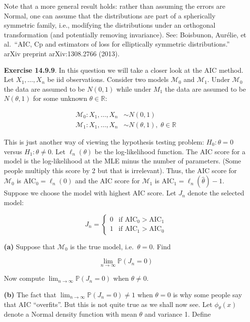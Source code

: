 Note that a more general result holds: rather than assuming the errors
are Normal, one can assume that the distributions are part of a
spherically symmetric family, i.e., modifying the distributions under an
orthogonal transformation (and potentially removing invariance). See:
Boisbunon, Aurélie, et al.~``AIC, Cp and estimators of loss for
elliptically symmetric distributions.'' arXiv preprint arXiv:1308.2766
(2013).

\textbf{Exercise 14.9.9}. In this question we will take a closer look at
the AIC method. Let \(X_1, \dots, X_n\) be iid observations. Consider
two models \(\mathcal{M}_0\) and \(\mathcal{M}_1\). Under
\(\mathcal{M}_0\) the data are assumed to be \(N(0, 1)\) while under
\(M_1\) the data are assumed to be \(N(\theta, 1)\) for some unknown
\(\theta \in \mathbb{R}\):

\begin{align}
\mathcal{M}_0 : X_1, \dots, X_n &\sim N(0, 1) \\
\mathcal{M}_1 : X_1, \dots, X_n &\sim N(\theta, 1), \; \theta \in \mathbb{R}
\end{align}

This is just another way of viewing the hypothesis testing problem:
\(H_0: \theta = 0\) versus \(H_1: \theta \neq 0\). Let
\(\ell_n(\theta)\) be the log-likelihood function. The AIC score for a
model is the log-likelihood at the MLE minus the number of parameters.
(Some people multiply this score by 2 but that is irrelevant). Thus, the
AIC score for \(\mathcal{M}_0\) is \(\text{AIC}_0 = \ell_n(0)\) and the
AIC score for \(\mathcal{M}_1\) is
\(\text{AIC}_1 = \ell_n(\hat{\theta}) - 1\). Suppose we choose the model
with highest AIC score. Let \(J_n\) denote the selected model:

\[J_n = \begin{cases}
0 & \text{if } \text{AIC}_0 > \text{AIC}_1 \\
1 & \text{if } \text{AIC}_1 > \text{AIC}_0
\end{cases}\]

\textbf{(a)} Suppose that \(\mathcal{M}_0\) is the true model,
i.e.~\(\theta = 0\). Find

\[ \lim_{n \rightarrow \infty} \mathbb{P}(J_n = 0) \]

Now compute \(\lim_{n \rightarrow \infty} \mathbb{P}(J_n = 0)\) when
\(\theta \neq 0\).

\textbf{(b)} The fact that
\(\lim_{n \rightarrow \infty} \mathbb{P}(J_n = 0) \neq 1\) when
\(\theta = 0\) is why some people say that AIC ``overfits''. But this is
not quite true as we shall now see. Let \(\phi_\theta(x)\) denote a
Normal density function with mean \(\theta\) and variance 1. Define

